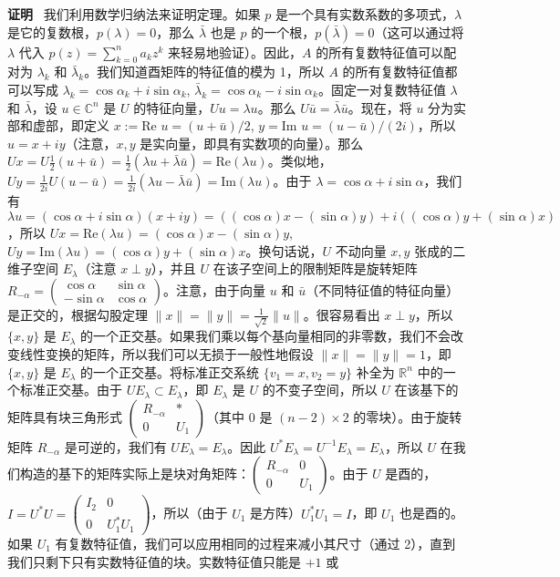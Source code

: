 \textbf{证明}~ 我们利用数学归纳法来证明定理。如果 $p$ 是一个具有实数系数的多项式，$\lambda$ 是它的复数根，$p(\lambda) = 0$，那么 $\bar{\lambda}$ 也是 $p$ 的一个根，$p(\bar{\lambda}) = 0$（这可以通过将 $\lambda$ 代入 $p(z) = \sum_{k=0}^n a_k z^k$ 来轻易地验证）。因此，$A$ 的所有复数特征值可以配对为 $\lambda_k$ 和 $\bar{\lambda}_k$。我们知道酉矩阵的特征值的模为 1，所以 $A$ 的所有复数特征值都可以写成 $\lambda_k = \cos \alpha_k + i \sin \alpha_k$, $\bar{\lambda}_k = \cos \alpha_k - i \sin \alpha_k$。固定一对复数特征值 $\lambda$ 和 $\bar{\lambda}$，设 $u \in \mathbb{C}^n$ 是 $U$ 的特征向量，$Uu = \lambda u$。那么 $U\bar{u} = \bar{\lambda}\bar{u}$。现在，将 $u$ 分为实部和虚部，即定义 $x := \text{Re } u = (u + \bar{u})/2$, $y = \text{Im } u = (u - \bar{u})/(2i)$，所以 $u = x + iy$（注意，$x, y$ 是实向量，即具有实数项的向量）。那么 $Ux = U \frac{1}{2}(u + \bar{u}) = \frac{1}{2}(\lambda u + \bar{\lambda} \bar{u}) = \text{Re}(\lambda u)$。类似地，$Uy = \frac{1}{2i} U(u - \bar{u}) = \frac{1}{2i}(\lambda u - \bar{\lambda} \bar{u}) = \text{Im}(\lambda u)$。由于 $\lambda = \cos \alpha + i \sin \alpha$，我们有 $\lambda u = (\cos \alpha + i \sin \alpha)(x + iy) = ((\cos \alpha)x - (\sin \alpha)y) + i((\cos \alpha)y + (\sin \alpha)x)$，所以 $Ux = \text{Re}(\lambda u) = (\cos \alpha)x - (\sin \alpha)y$, $Uy = \text{Im}(\lambda u) = (\cos \alpha)y + (\sin \alpha)x$。换句话说，$U$ 不动向量 $x, y$ 张成的二维子空间 $E_\lambda$（注意 $x \perp y$），并且 $U$ 在该子空间上的限制矩阵是旋转矩阵 $R_{-\alpha} = \begin{pmatrix} \cos \alpha & \sin \alpha \\ -\sin \alpha & \cos \alpha \end{pmatrix}$。注意，由于向量 $u$ 和 $\bar{u}$（不同特征值的特征向量）是正交的，根据勾股定理 $\|x\| = \|y\| = \frac{1}{\sqrt{2}}\|u\|$。很容易看出 $x \perp y$，所以 $\{x, y\}$ 是 $E_\lambda$ 的一个正交基。如果我们乘以每个基向量相同的非零数，我们不会改变线性变换的矩阵，所以我们可以无损于一般性地假设 $\|x\| = \|y\| = 1$，即 $\{x, y\}$ 是 $E_\lambda$ 的一个正交基。将标准正交系统 $\{v_1 = x, v_2 = y\}$ 补全为 $\mathbb{R}^n$ 中的一个标准正交基。由于 $UE_\lambda \subset E_\lambda$，即 $E_\lambda$ 是 $U$ 的不变子空间，所以 $U$ 在该基下的矩阵具有块三角形式 $\begin{pmatrix} R_{-\alpha} & * \\ 0 & U_1 \end{pmatrix}$（其中 $0$ 是 $(n-2) \times 2$ 的零块）。由于旋转矩阵 $R_{-\alpha}$ 是可逆的，我们有 $U E_\lambda = E_\lambda$。因此 $U^*E_\lambda = U^{-1}E_\lambda = E_\lambda$，所以 $U$ 在我们构造的基下的矩阵实际上是块对角矩阵：$\begin{pmatrix} R_{-\alpha} & 0 \\ 0 & U_1 \end{pmatrix}$。由于 $U$ 是酉的， $I = U^*U = \begin{pmatrix} I_2 & 0 \\ 0 & U_1^*U_1 \end{pmatrix}$，所以（由于 $U_1$ 是方阵）$U_1^*U_1 = I$，即 $U_1$ 也是酉的。如果 $U_1$ 有复数特征值，我们可以应用相同的过程来减小其尺寸（通过 2），直到我们只剩下只有实数特征值的块。实数特征值只能是 $+1$ 或 